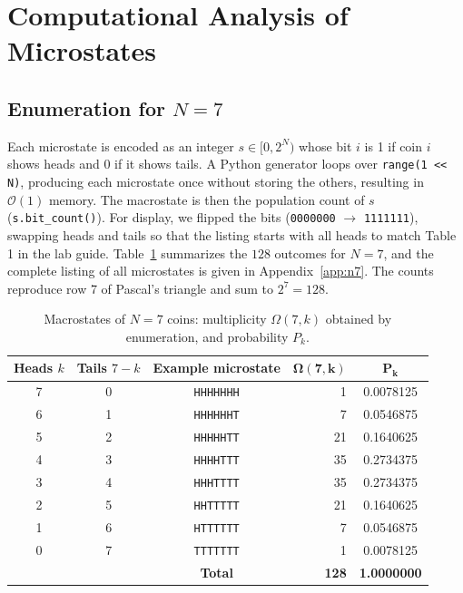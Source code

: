 \documentclass[11pt, a4paper]{article}
\begin{document}
\section{Computational Analysis of Microstates}

\subsection{Enumeration for $N=7$}
Each microstate is encoded as an integer $s\in[0,2^N)$ whose bit $i$ is 1 if coin $i$ shows heads and 0 if it shows tails. A Python generator loops over \texttt{range(1 << N)}, producing each microstate once without storing the others, resulting in $\mathcal{O}(1)$ memory. The macrostate is then the population count of $s$ (\texttt{s.bit\_count()}). For display, we flipped the bits (\texttt{0000000} $\to$ \texttt{1111111}), swapping heads and tails so that the listing starts with all heads to match Table 1 in the lab guide. Table~\ref{tab:macrostate_7} summarizes the $128$ outcomes for $N=7$, and the complete listing of all microstates is given in Appendix~\ref{app:n7}. The counts reproduce row 7 of Pascal's triangle and sum to $2^7 = 128$.

\begin{table}[H]
\centering
\caption{Macrostates of $N=7$ coins: multiplicity $\Omega(7,k)$ obtained by enumeration, and probability $P_k$.}
\label{tab:macrostate_7}
\footnotesize
\begin{tabular}{cccrc}
\toprule
\textbf{Heads $k$} & \textbf{Tails $7-k$} & \textbf{Example microstate} & $\mathbf{\Omega(7,k)}$ & $\mathbf{P_k}$ \\
\midrule
7 & 0 & \texttt{HHHHHHH} & 1  & 0.0078125 \\
6 & 1 & \texttt{HHHHHHT} & 7  & 0.0546875 \\
5 & 2 & \texttt{HHHHHTT} & 21 & 0.1640625 \\
4 & 3 & \texttt{HHHHTTT} & 35 & 0.2734375 \\
3 & 4 & \texttt{HHHTTTT} & 35 & 0.2734375 \\
2 & 5 & \texttt{HHTTTTT} & 21 & 0.1640625 \\
1 & 6 & \texttt{HTTTTTT} & 7  & 0.0546875 \\
0 & 7 & \texttt{TTTTTTT} & 1  & 0.0078125 \\
\midrule
 & & \textbf{Total} & \textbf{128} & \textbf{1.0000000} \\
\bottomrule
\end{tabular}
\end{table}
\end{document}
